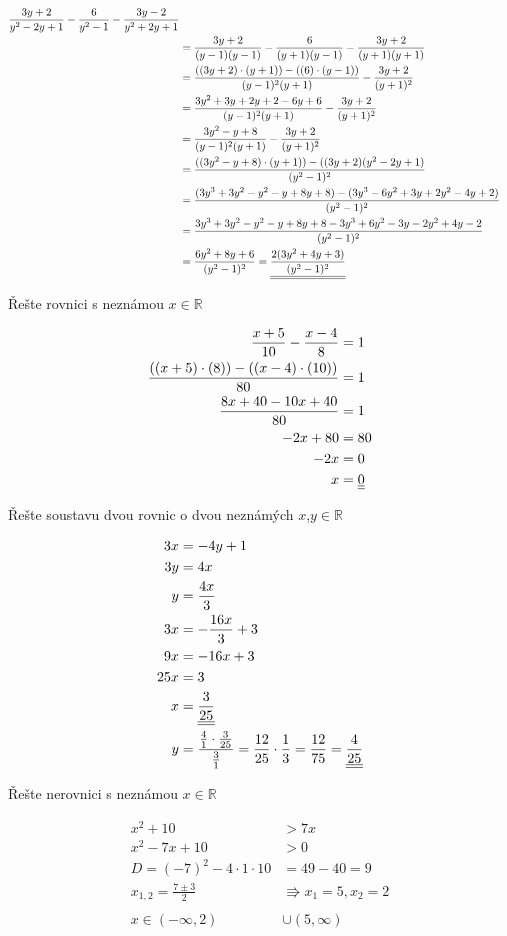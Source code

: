 \begin{align*}
    \frac{3y+2}{y^2-2y+1} - \frac{6}{y^2-1} - \frac{3y-2}{y^2+2y+1} 
    \\ &= \frac{3y+2}{(y-1)(y-1)} - \frac{6}{(y+1)(y-1)} - \frac{3y+2}{(y+1)(y+1)} 
    \\ &= \frac{((3y+2)\cdot(y+1))-((6)\cdot(y-1))}{(y-1)^2(y+1)} - \frac{3y+2}{(y+1)^2}
    \\ &= \frac{3y^2+3y+2y+2-6y+6}{(y-1)^2(y+1)} - \frac{3y+2}{(y+1)^2}
    \\ &= \frac{3y^2-y+8}{(y-1)^2(y+1)} - \frac{3y+2}{(y+1)^2}
    \\ &= \frac{((3y^2-y+8)\cdot(y+1))-((3y+2)(y^2-2y+1)}{(y^2-1)^2}
    \\ &= \frac{(3y^3+3y^2-y^2-y+8y+8)-(3y^3-6y^2+3y+2y^2-4y+2)}{(y^2-1)^2}
    \\ &= \frac{3y^3+3y^2-y^2-y+8y+8-3y^3+6y^2-3y-2y^2+4y-2}{(y^2-1)^2}
    \\ &= \frac{6y^2+8y+6}{(y^2-1)^2}
    = \underline{\underline{\frac{2(3y^2+4y+3)}{(y^2-1)^2}}}
\end{align*}
\begin{example}
    Řešte rovnici s neznámou $x \in \mathbb{R} $ 
\end{example}
\begin{align*}
    \frac{x+5}{10} - \frac{x-4}{8} &= 1
    \\ \frac{((x+5)\cdot(8)) - ((x-4)\cdot(10))}{80} &= 1
    \\ \frac{8x+40-10x+40}{80} &= 1
    \\ -2x + 80 &= 80
    \\ -2x &= 0
    \\ x &= \underline{\underline{0}}
\end{align*}
\begin{example}
    Řešte soustavu dvou rovnic o dvou neznámých $x$,$y \in \mathbb{R}$
\end{example}
\begin{align*}
    3x &= -4y+1
    \\ 3y &= 4x
    \\ y &= \frac{4x}{3}
    \\ 3x &= -\frac{16x}{3} + 3
    \\ 9x &= -16x +3
    \\ 25x &= 3
    \\  x &= \underline{\underline{\frac{3}{25}}}
    \\ y &= \frac{\frac{4}{1}\cdot \frac{3}{25}}{\frac{3}{1}} = \frac{12}{25} \cdot \frac{1}{3} = \frac{12}{75} = \underline{\underline{\frac{4}{25}}}
\end{align*}
\begin{example}
    Řešte nerovnici s neznámou $x \in \mathbb{R}$
\end{example}
\begin{align*}
    x^2+10 &> 7x
    \\
    x^2 -7x + 10 &> 0 \\
    D = (-7)^2 - 4\cdot1\cdot10 &= 49-40 = 9 \\
    x_{1,2} = \frac{7 \pm 3}{2} &\Rrightarrow x_1 = 5, x_2 = 2 \\\\
    x \in (-\infty, 2) &\cup (5, \infty) 
\end{align*}
\page
